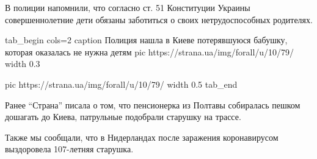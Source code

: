 В полиции напомнили, что согласно ст. 51 Конституции Украины совершеннолетние
дети обязаны заботиться о своих нетрудоспособных родителях.

\ifcmt
tab_begin cols=2
	caption Полиция нашла в Киеве потерявшуюся бабушку, которая оказалась не нужна детям
	pic https://strana.ua/img/forall/u/10/79/%
	width 0.3
	
	pic https://strana.ua/img/forall/u/10/79/%
	width 0.5
tab_end
\fi

Ранее \enquote{Страна} писала о том, что пенсионерка из Полтавы собиралась пешком
дошагать до Киева, патрульные подобрали старушку на трассе.

Также мы сообщали, что в Нидерландах после заражения коронавирусом
выздоровела 107-летняя старушка.

